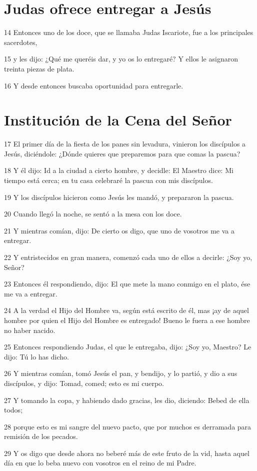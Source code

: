 \section*{Judas ofrece entregar a Jesús}

\par 14 Entonces uno de los doce, que se llamaba Judas Iscariote, fue a los principales sacerdotes,
\par 15 y les dijo: ¿Qué me queréis dar, y yo os lo entregaré? Y ellos le asignaron treinta piezas de plata.
\par 16 Y desde entonces buscaba oportunidad para entregarle.

\section*{Institución de la Cena del Señor}

\par 17 El primer día de la fiesta de los panes sin levadura, vinieron los discípulos a Jesús, diciéndole: ¿Dónde quieres que preparemos para que comas la pascua?
\par 18 Y él dijo: Id a la ciudad a cierto hombre, y decidle: El Maestro dice: Mi tiempo está cerca; en tu casa celebraré la pascua con mis discípulos.
\par 19 Y los discípulos hicieron como Jesús les mandó, y prepararon la pascua.
\par 20 Cuando llegó la noche, se sentó a la mesa con los doce.
\par 21 Y mientras comían, dijo: De cierto os digo, que uno de vosotros me va a entregar.
\par 22 Y entristecidos en gran manera, comenzó cada uno de ellos a decirle: ¿Soy yo, Señor?
\par 23 Entonces él respondiendo, dijo: El que mete la mano conmigo en el plato, ése me va a entregar.
\par 24 A la verdad el Hijo del Hombre va, según está escrito de él, mas ¡ay de aquel hombre por quien el Hijo del Hombre es entregado! Bueno le fuera a ese hombre no haber nacido.
\par 25 Entonces respondiendo Judas, el que le entregaba, dijo: ¿Soy yo, Maestro? Le dijo: Tú lo has dicho.
\par 26 Y mientras comían, tomó Jesús el pan, y bendijo, y lo partió, y dio a sus discípulos, y dijo: Tomad, comed; esto es mi cuerpo.
\par 27 Y tomando la copa, y habiendo dado gracias, les dio, diciendo: Bebed de ella todos;
\par 28 porque esto es mi sangre del nuevo pacto, que por muchos es derramada para remisión de los pecados.
\par 29 Y os digo que desde ahora no beberé más de este fruto de la vid, hasta aquel día en que lo beba nuevo con vosotros en el reino de mi Padre.

